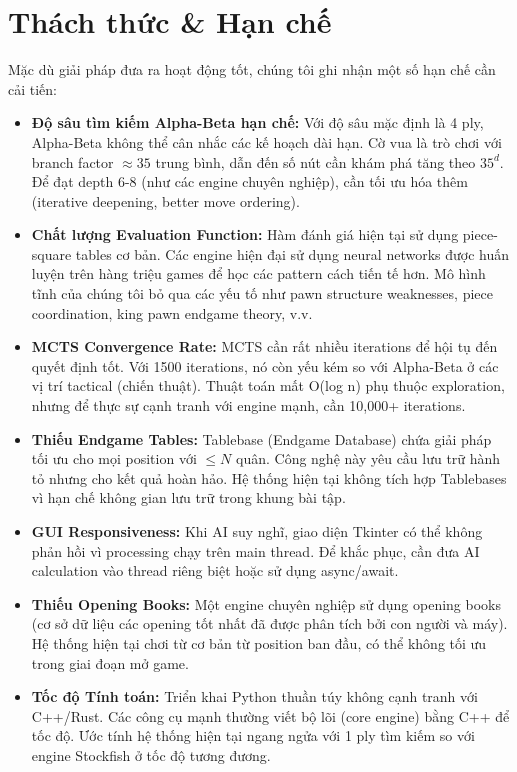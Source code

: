 \section{Thách thức \& Hạn chế}

Mặc dù giải pháp đưa ra hoạt động tốt, chúng tôi ghi nhận một số hạn chế cần cải tiến:

\begin{itemize}
    \item \textbf{Độ sâu tìm kiếm Alpha-Beta hạn chế:} Với độ sâu mặc định là 4 ply, Alpha-Beta không thể cân nhắc các kế hoạch dài hạn. Cờ vua là trò chơi với branch factor $\approx 35$ trung bình, dẫn đến số nút cần khám phá tăng theo $35^d$. Để đạt depth 6-8 (như các engine chuyên nghiệp), cần tối ưu hóa thêm (iterative deepening, better move ordering).

    \item \textbf{Chất lượng Evaluation Function:} Hàm đánh giá hiện tại sử dụng piece-square tables cơ bản. Các engine hiện đại sử dụng neural networks được huấn luyện trên hàng triệu games để học các pattern cách tiến tế hơn. Mô hình tĩnh của chúng tôi bỏ qua các yếu tố như pawn structure weaknesses, piece coordination, king pawn endgame theory, v.v.

    \item \textbf{MCTS Convergence Rate:} MCTS cần rất nhiều iterations để hội tụ đến quyết định tốt. Với 1500 iterations, nó còn yếu kém so với Alpha-Beta ở các vị trí tactical (chiến thuật). Thuật toán mất O(log n) phụ thuộc exploration, nhưng để thực sự cạnh tranh với engine mạnh, cần 10,000+ iterations.

    \item \textbf{Thiếu Endgame Tables:} Tablebase (Endgame Database) chứa giải pháp tối ưu cho mọi position với $\leq N$ quân. Công nghệ này yêu cầu lưu trữ hành tỏ nhưng cho kết quả hoàn hảo. Hệ thống hiện tại không tích hợp Tablebases vì hạn chế không gian lưu trữ trong khung bài tập.

    \item \textbf{GUI Responsiveness:} Khi AI suy nghĩ, giao diện Tkinter có thể không phản hồi vì processing chạy trên main thread. Để khắc phục, cần đưa AI calculation vào thread riêng biệt hoặc sử dụng async/await.

    \item \textbf{Thiếu Opening Books:} Một engine chuyên nghiệp sử dụng opening books (cơ sở dữ liệu các opening tốt nhất đã được phân tích bởi con người và máy). Hệ thống hiện tại chơi từ cơ bản từ position ban đầu, có thể không tối ưu trong giai đoạn mở game.

    \item \textbf{Tốc độ Tính toán:} Triển khai Python thuần túy không cạnh tranh với C++/Rust. Các công cụ mạnh thường viết bộ lõi (core engine) bằng C++ để tốc độ. Ước tính hệ thống hiện tại ngang ngửa với 1 ply tìm kiếm so với engine Stockfish ở tốc độ tương đương.
\end{itemize}

